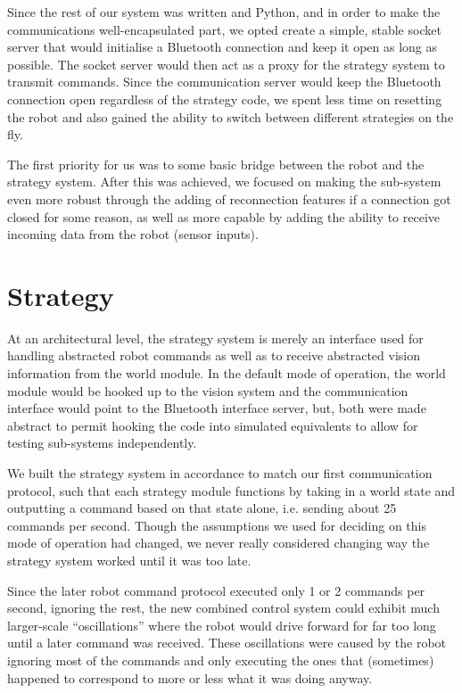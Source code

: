 \documentclass[12pt,a4paper,notitlepage,twocolumn]{report}
\begin{document}
Since the rest of our system was written and Python, and in order to
make the communications well-encapsulated part, we opted create a
simple, stable socket server that would initialise a Bluetooth
connection and keep it open as long as possible. The socket server
would then act as a proxy for the strategy system to transmit
commands. Since the communication server would keep the Bluetooth
connection open regardless of the strategy code, we spent less time on
resetting the robot and also gained the ability to switch between
different strategies on the fly.

The first priority for us was to some basic bridge between the robot
and the strategy system. After this was achieved, we focused on making
the sub-system even more robust through the adding of reconnection
features if a connection got closed for some reason, as well as more
capable by adding the ability to receive incoming data from the robot
(sensor inputs).

\section*{Strategy}
At an architectural level, the strategy system is merely an interface
used for handling abstracted robot commands as well as to receive
abstracted vision information from the world module. In the default
mode of operation, the world module would be hooked up to the vision
system and the communication interface would point to the Bluetooth
interface server, but, both were made abstract to permit hooking the
code into simulated equivalents to allow for testing sub-systems
independently.

We built the strategy system in accordance to match our first
communication protocol, such that each strategy module functions by
taking in a world state and outputting a command based on that state
alone, i.e. sending about 25 commands per second. Though the
assumptions we used for deciding on this mode of operation had
changed, we never really considered changing way the strategy system
worked until it was too late.

Since the later robot command protocol executed only 1 or 2 commands
per second, ignoring the rest, the new combined control system could
exhibit much larger-scale “oscillations” where the robot would drive
forward for far too long until a later command was received. These
oscillations were caused by the robot ignoring most of the commands
and only executing the ones that (sometimes) happened to correspond to
more or less what it was doing anyway.
\end{document}
